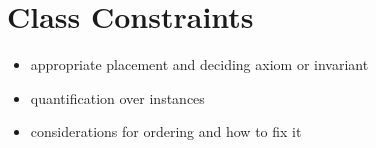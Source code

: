 \section{Class Constraints}
\label{sec:classdiagrams-constraints}

\begin{itemize}
	\item appropriate placement and deciding axiom or invariant

	\item quantification over instances

	\item considerations for ordering and how to fix it

\end{itemize}
